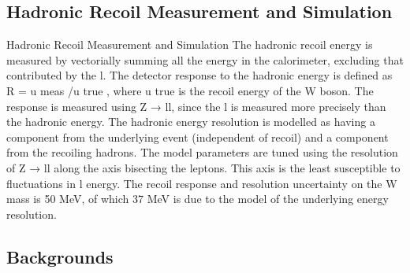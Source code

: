 \documentclass[aspectratio=1610, 9pt]{beamer}
\begin{document}
\subsection{Hadronic Recoil Measurement and Simulation}

\begin{frame}{Hadronic Recoil Measurement and Simulation}
  The hadronic recoil energy is measured by vectorially summing all the energy in the calorimeter,
  excluding that contributed by the l. The detector response to the hadronic energy is defined as R = u meas /u true , where u true is the recoil energy of the W boson. The response is measured
using Z → ll, since the l is measured more precisely than the hadronic energy.
The hadronic energy resolution is modelled as having a component from the underlying event
(independent of recoil) and a component from the recoiling hadrons. The model parameters are
tuned using the resolution of Z → ll along the axis bisecting the leptons. This axis is the least
susceptible to fluctuations in l energy. The recoil response and resolution uncertainty on the W
mass is 50 MeV, of which 37 MeV is due to the model of the underlying energy resolution.
\end{frame}

\subsection{Backgrounds}
\end{document}
